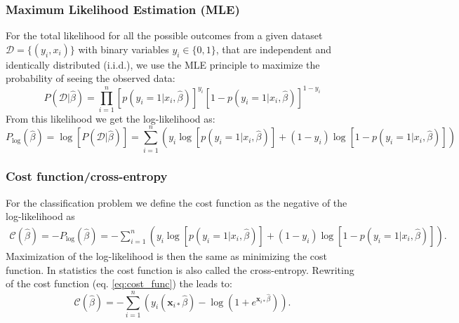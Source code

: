 \documentclass[12pt,a4paper,english]{article}
\begin{document}
\subsubsection{Maximum Likelihood Estimation (MLE)}
\label{subsect:MLE}
For the total likelihood for all the possible outcomes from a given dataset $\mathcal{D}=\{(y_i, x_i)\}$ with binary variables $y_i\in\{0,1\}$, that are independent and identically distributed (i.i.d.), we use the MLE principle to maximize the probability of seeing the observed data:
\begin{equation}
\label{eq:max_likelihood}
P(\mathcal{D}|\hat{\beta})=\prod_{i=1}^{n}\left[p(y_i=1|x_i,\hat{\beta})\right]^{y_i}\left[1-p(y_i=1|x_i,\hat{\beta})\right]^{1-y_i}
\end{equation}
From this likelihood we get the log-likelihood as:
\begin{equation}
\label{eq:log_likelihood}
P_{\log }(\hat{\beta})=\log[P(\mathcal{D}|\hat{\beta})]=\sum_{i=1}^{n}\left(y_i\log[p(y_i=1|x_i,\hat{\beta})]+(1-y_i)\log[1-p(y_i=1|x_i,\hat{\beta})]\right)
\end{equation}

\subsubsection{Cost function/cross-entropy}
\label{subsect:Cost_func}
For the classification problem we define the cost function as the negative of the log-likelihood as 
\begin{align}
\label{eq:cost_func}
\mathcal{C}(\hat{\beta})=-P_{\log }(\hat{\beta})= -\sum_{i=1}^{n}\left(y_i\log[p(y_i=1|x_i,\hat{\beta})]+(1-y_i)\log[1-p(y_i=1|x_i,\hat{\beta})]\right).
\end{align}
Maximization of the log-likelihood is then the same as minimizing the cost function. In statistics the cost function is also called the cross-entropy. Rewriting of the cost function (eq. \ref{eq:cost_func}) the leads to:
\begin{equation}
\label{eq:cost_func_rewritten}
\mathcal{C}(\hat{\beta})=-\sum_{i=1}^{n}\left(y_i(\textbf{x}_{i*}\hat{\beta})-\log(1+e^{\textbf{x}_{i*}\hat{\beta}})\right).
\end{equation}
\end{document}

